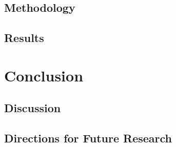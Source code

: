 \documentclass[onehalf,11pt]{beavtex}
\begin{document}
\section{Methodology}
\section{Results}


\chapter{Conclusion}
\section{Discussion}
\section{Directions for Future Research}






%
\end{document}
